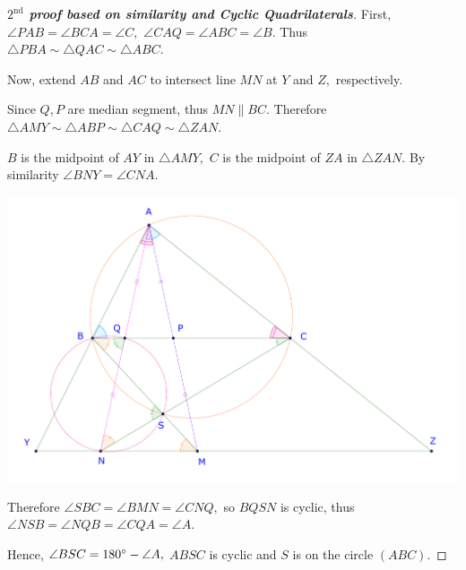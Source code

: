 \documentclass{article}
\begin{document}
\newpage

\begin{proof}[\textbf{$2^{\text{nd}}$ proof based on similarity and Cyclic Quadrilaterals}]
    First, $\angle PAB = \angle BCA = \angle C,$ $\angle CAQ = \angle ABC = \angle B.$
    Thus $\triangle PBA \sim \triangle QAC \sim \triangle ABC.$

    Now, extend $AB$ and $AC$ to intersect line $MN$ at $Y$ and $Z,$ respectively.

    Since $Q, P$ are median segment, thus $MN \parallel BC.$
    Therefore $\triangle AMY \sim \triangle ABP \sim \triangle CAQ \sim \triangle ZAN.$

    $B$ is the midpoint of $AY$ in $\triangle AMY,$ $C$ is the midpoint of $ZA$ in $\triangle ZAN.$
    By similarity $\angle BNY = \angle CNA.$

    \begin{center}
        \includegraphics[width=14cm]{./svg/pdf/ot-22-23-4-e2-s5.pdf}
    \end{center}
    
    Therefore $\angle SBC = \angle BMN = \angle CNQ,$ so $BQSN$ is cyclic, thus $\angle NSB = \angle NQB = \angle CQA = \angle A.$

    Hence, $\angle BSC = 180^\circ - \angle A,$ $ABSC$ is cyclic and $S$ is on the circle $(ABC).$
\end{proof}

\newpage
\end{document}
